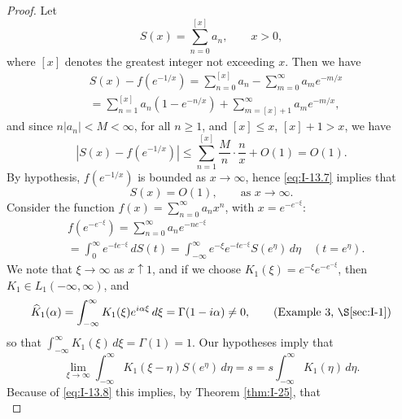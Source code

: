 \begin{proof}
Let
\begin{equation*}
S(x)=\sum_{n=0}^{[x]}a_n,\qquad x>0,
\end{equation*}
where $[x]$ denotes the greatest integer not exceeding $x$. Then we have
\begin{equation*}
\begin{aligned}
&S(x) - f(e^{-1/x}) = \sum_{n=0}^{[x]}a_n - \sum_{m=0}^{\infty}a_m e^{-m/x}\\
&= \sum_{n=1}^{[x]}a_n(1-e^{-n/x}) + \sum_{m=[x]+1}^{\infty}a_m e^{-m/x},
\end{aligned}
\end{equation*}
and since $n|a_n|<M<\infty$, for all $n\ge 1$, and $[x]\le x$, $[x]+1>x$, we have
\begin{equation}\label{eq:I-13.7}\tag{13.7}
|S(x)-f(e^{-1/x})|\le\sum_{n=1}^{[x]}\frac{M}{n}\cdot\frac{n}{x}+O(1)=O(1).
\end{equation}
By hypothesis, $f(e^{-1/x})$ is bounded as $x\to\infty$, hence \eqref{eq:I-13.7} implies that
\begin{equation}\label{eq:I-13.8}\tag{13.8}
S(x)=O(1),\qquad\text{as }x\to\infty.
\end{equation}
Consider the function $f(x)=\sum_{n=0}^{\infty}a_nx^n$, with $x=e^{-e^{-\xi}}$:
\begin{equation*}
\begin{aligned}
&f(e^{-e^{-\xi}}) = \sum_{n=0}^{\infty}a_ne^{-ne^{-\xi}}\\
&= \int_{0}^{\infty}e^{-te^{-\xi}}\,dS(t) = \int_{-\infty}^{\infty}e^{-\xi}e^{-te^{-\xi}}S(e^\eta)\,d\eta \quad(t=e^\eta).
\end{aligned}
\end{equation*}
We note that $\xi\to\infty$ as $x\uparrow 1$, and if we choose $K_1(\xi)=e^{-\xi}e^{-e^{-\xi}}$, then $K_1\in L_1(-\infty,\infty)$, and
\begin{equation*}
\widehat K_1(\alpha)=\int_{-\infty}^{\infty}K_1(\xi)e^{i\alpha\xi}\,d\xi=\Gamma(1-i\alpha)\neq 0,\qquad\text{(Example 3, \S\ref{sec:I-1})}
\end{equation*}
so that $\int_{-\infty}^{\infty}K_1(\xi)\,d\xi=\Gamma(1)=1$. Our hypotheses imply that
\begin{equation}\label{eq:I-13.9}\tag{13.9}
\lim_{\xi\to\infty}\int_{-\infty}^{\infty}K_1(\xi-\eta)S(e^\eta)\,d\eta
=s=s\int_{-\infty}^{\infty}K_1(\eta)\,d\eta.
\end{equation}
Because of \eqref{eq:I-13.8} this implies, by Theorem \ref{thm:I-25}, that
\begin{equation}\label{eq:I-13.10}\tag{13.10}

\end{equation}
\end{proof}
